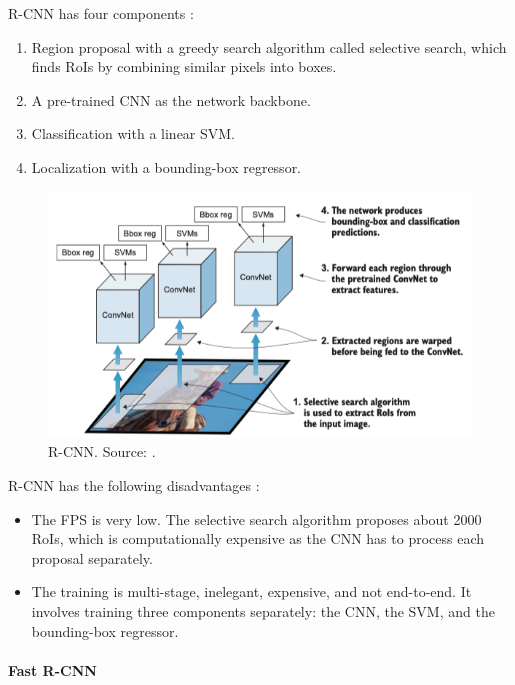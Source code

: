 \documentclass[a4paper, 11pt, oneside]{article}
\begin{document}
R-CNN has four components \cite{elgendy2020deep, girshick2014rich}:

\begin{enumerate}
  \item Region proposal with a greedy search algorithm called selective search, which finds RoIs by combining similar
  pixels into boxes.
  \item A pre-trained CNN as the network backbone.
  \item Classification with a linear SVM.
  \item Localization with a bounding-box regressor.
\end{enumerate}

\begin{figure}[ht]
  \begin{center}
    \includegraphics[width=.8\textwidth]{r_cnn.png}
  \end{center}
  \caption{R-CNN. Source: \cite{elgendy2020deep}.}
\end{figure}

R-CNN has the following disadvantages \cite{elgendy2020deep, girshick2014rich, girshick2015fast}:

\begin{itemize}
  \item The FPS is very low. The selective search algorithm proposes about 2000 RoIs, which is computationally
  expensive as the CNN has to process each proposal separately.
  \item The training is multi-stage, inelegant, expensive, and not end-to-end. It involves training three components
  separately: the CNN, the SVM, and the bounding-box regressor.
\end{itemize}

\paragraph{Fast R-CNN}
\end{document}

